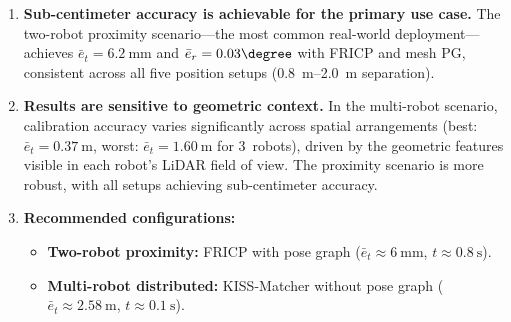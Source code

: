 \begin{enumerate}
    \item \textbf{Sub-centimeter accuracy is achievable for the
          primary use case.}
          The two-robot proximity scenario---the most common real-world
          deployment---achieves $\bar{e}_t = \SI{6.2}{\milli\metre}$
          and $\bar{e}_r = 0.03\degree$ with FRICP and mesh PG,
          consistent across all five position setups
          (\SIrange{0.8}{2.0}{\metre} separation).

    \item \textbf{Results are sensitive to geometric context.}
          In the multi-robot scenario, calibration accuracy varies
          significantly across spatial arrangements (best:
          $\bar{e}_t = \SI{0.37}{\metre}$, worst:
          $\bar{e}_t = \SI{1.60}{\metre}$ for 3~robots), driven by
          the geometric features visible in each robot's LiDAR field
          of view.
          The proximity scenario is more robust, with all setups
          achieving sub-centimeter accuracy.

    \item \textbf{Recommended configurations:}
          \begin{itemize}
              \item \textbf{Two-robot proximity:} FRICP with pose graph
                    ($\bar{e}_t \approx \SI{6}{\milli\metre}$,
                    $t \approx \SI{0.8}{\second}$).
              \item \textbf{Multi-robot distributed:} KISS-Matcher
                    without pose graph
                    ($\bar{e}_t \approx \SI{2.58}{\metre}$,
                    $t \approx \SI{0.1}{\second}$).
          \end{itemize}
\end{enumerate}

